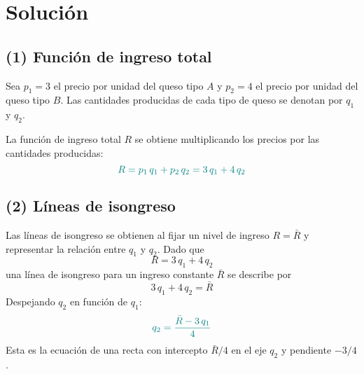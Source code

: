 \documentclass{article}
\begin{document}
\section*{Solución}




\subsection*{(1) Función de ingreso total}

Sea \(p_1 = 3\) el precio por unidad del queso tipo \(A\) y \(p_2 = 4\) el precio por unidad del queso tipo \(B\). 
Las cantidades producidas de cada tipo de queso se denotan por \(q_1\) y \(q_2\). 

La función de ingreso total \(R\) se obtiene multiplicando los precios por las cantidades producidas:
\[\color{teal}
R = p_1 \, q_1 + p_2 \, q_2 = 3\,q_1 + 4\,q_2
\]

\subsection*{(2) Líneas de isongreso}

Las líneas de isongreso se obtienen al fijar un nivel de ingreso \(R = \bar{R}\) y representar la relación entre \(q_1\) y \(q_2\). Dado que
\[
R = 3\,q_1 + 4\,q_2
\]
una línea de isongreso para un ingreso constante \(\bar{R}\) se describe por
\[
3\,q_1 + 4\,q_2 = \bar{R}
\]
Despejando \(q_2\) en función de \(q_1\):
\[\color{teal}
q_2 = \frac{\bar{R} - 3\,q_1}{4}
\]
Esta es la ecuación de una recta con intercepto \(\bar{R}/4\) en el eje \(q_2\) y pendiente \(-3/4\).
\begin{center}
\end{center}
\end{document}
